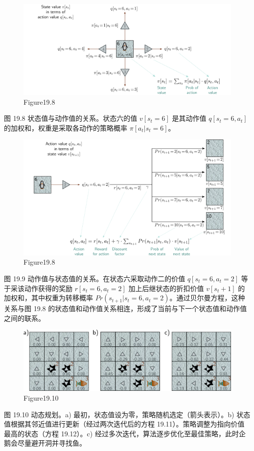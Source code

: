 \begin{figure}[ht!]
\centering
\includegraphics[width=0.7\linewidth]{png/chapter19/ReinforceBellman3.png}
\caption{Figure19.8}
\end{figure}
图 19.8 状态值与动作值的关系。状态六的值 \(v[s_t =6]\) 是其动作值 \(q[s_t =6,a_t]\) 的加权和，权重是采取各动作的策略概率 \(\pi[a_t|s_t =6]\)。

\begin{figure}[ht!]
\centering
\includegraphics[width=0.7\linewidth]{png/chapter19/ReinforceBellman2.png}
\caption{Figure19.8}
\end{figure}
图 19.9 动作值与状态值的关系。在状态六采取动作二的价值 \(q[s_t = 6, a_t = 2]\) 等于采该动作获得的奖励 \(r[s_t = 6, a_t = 2]\) 加上后继状态的折扣价值 \(v[s_t+1]\) 的加权和，其中权重为转移概率 \(Pr(s_{t+1}|s_t = 6, a_t = 2)\)。通过贝尔曼方程，这种关系与图 19.8 的状态值和动作值关系相连，形成了当前与下一个状态值和动作值之间的联系。

\begin{figure}[ht!]
\centering
\includegraphics[width=0.7\linewidth]{png/chapter19/ReinforceDP.png}
\caption{Figure19.10}
\end{figure}
图 19.10 动态规划。a) 最初，状态值设为零，策略随机选定（箭头表示）。b) 状态值根据其邻近值进行更新（经过两次迭代后的方程 19.11）。策略调整为指向价值最高的状态（方程 19.12）。c) 经过多次迭代，算法逐步优化至最佳策略，此时企鹅会尽量避开洞并寻找鱼。

